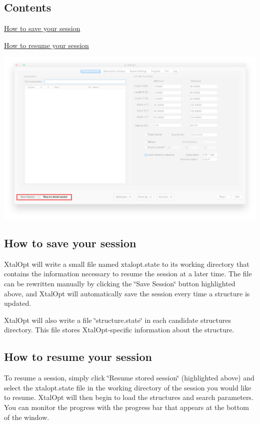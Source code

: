 \hypertarget{xo_saveresume_sr_contents}{}\subsection{Contents}\label{xo_saveresume_sr_contents}

\begin{DoxyItemize}
\item \hyperlink{xo_saveresume_sr_saving}{How to save your session}
\item \hyperlink{xo_saveresume_sr_resuming}{How to resume your session}
\end{DoxyItemize}

 
\begin{DoxyImageNoCaption}
  \mbox{\includegraphics[width=\textwidth]{xo-saveresume.png}}
\end{DoxyImageNoCaption}
\hypertarget{xo_saveresume_sr_saving}{}\subsection{How to save your session}\label{xo_saveresume_sr_saving}
Xtal\+Opt will write a small file named xtalopt.\+state to its working directory that contains the information necessary to resume the session at a later time. The file can be rewritten manually by clicking the \char`\"{}\+Save Session\char`\"{} button highlighted above, and Xtal\+Opt will automatically save the session every time a structure is updated.

Xtal\+Opt will also write a file \char`\"{}structure.\+state\char`\"{} in each candidate structure\textquotesingle{}s directory. This file stores Xtal\+Opt-\/specific information about the structure.\hypertarget{xo_saveresume_sr_resuming}{}\subsection{How to resume your session}\label{xo_saveresume_sr_resuming}
To resume a session, simply click \char`\"{}\+Resume stored session\char`\"{} (highlighted above) and select the xtalopt.\+state file in the working directory of the session you would like to resume. Xtal\+Opt will then begin to load the structures and search parameters. You can monitor the progress with the progress bar that appears at the bottom of the window.

